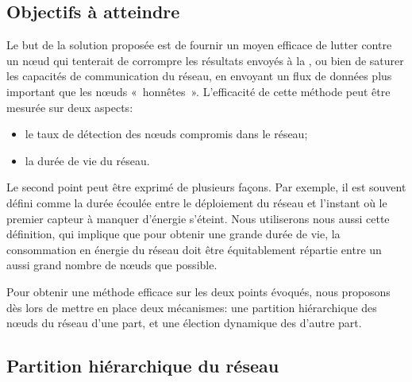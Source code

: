     \subsection{Objectifs à atteindre}

Le but de la solution proposée est de fournir un moyen efficace de lutter contre un nœud qui tenterait de corrompre les résultats envoyés à la \sdb, ou bien de saturer les capacités de communication du réseau, en envoyant un flux de données plus important que les nœuds «~honnêtes~».
L'efficacité de cette méthode peut être mesurée sur deux aspects:
\begin{itemize}
    \item le taux de détection des nœuds compromis dans le réseau;
    \item la durée de vie du réseau.
\end{itemize}
Le second point peut être exprimé de plusieurs façons.
Par exemple, il est souvent défini comme la durée écoulée entre le déploiement du réseau et l'instant où le premier capteur à manquer d'énergie s'éteint.
Nous utiliserons nous aussi cette définition, qui implique que pour obtenir une grande durée de vie, la consommation en énergie du réseau doit être équitablement répartie entre un aussi grand nombre de nœuds que possible.

Pour obtenir une méthode efficace sur les deux points évoqués, nous proposons dès lors de mettre en place deux mécanismes: une partition hiérarchique des nœuds du réseau d'une part, et une élection dynamique des \cns d'autre part.

    \subsection{Partition hiérarchique du réseau}

